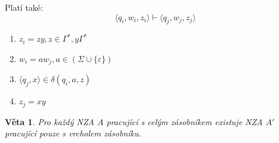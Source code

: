 \documentclass[10pt, a4paper, titlepage]{article}
\theoremstyle{note}
\newtheorem{veta}{Věta}
\begin{document}
Platí také:
$$
\langle q_i, w_i, z_i \rangle \vdash \langle q_j, w_j, z_j \rangle
$$
\begin{enumerate}
\item
$z_i = zy, z \in \Gamma^*, y \Gamma^*$

\item
$w_i = aw_j, a \in (\Sigma \cup \lbrace \varepsilon \rbrace)$

\item
$\langle q_j, x \rangle \in \delta(q_i, a, z)$

\item
$z_j = xy$
\end{enumerate}

\begin{veta}
Pro každý NZA $A$ pracující s celým zásobníkem existuje NZA $A'$ pracující pouze s vrcholem zásobníku.
\end{veta}
\end{document}
